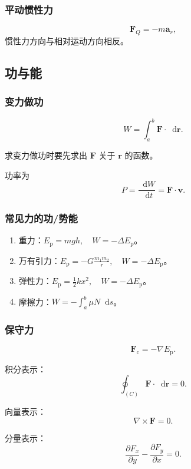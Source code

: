 \documentclass[UTF8,fontset=fandol,zihao=5]{ctexart}
\newcommand{\vect}[1]{\bm{#1}}
\newcommand{\dif}{\mathop{}\!\mathrm{d}}
\begin{document}
\subsubsection{平动惯性力}

\[
  \vect F_Q=-m\vect a_r,
\]
惯性力方向与相对运动方向相反。

\subsection{功与能}

\subsubsection{变力做功}

\[
  W=\int_a^b\vect F\cdot\dif\vect r.
\]

\begin{method}[【方法】求变力做功]
求变力做功时要先求出 \(\vect F\) 关于 \(\vect r\) 的函数。

功率为
\[
  P=\frac{\dif W}{\dif t}=\vect F\cdot\vect v.
\]
\end{method}

\subsubsection{常见力的功/势能}

\begin{enumerate}
  \item 重力：\(E_{\mathrm p}=mgh,\quad W=-\Delta E_{\mathrm p}\)。
  \item 万有引力：\(\displaystyle E_{\mathrm p}=-G\frac{m_1m_2}{r},\quad W=-\Delta E_{\mathrm p}\)。
  \item 弹性力：\(\displaystyle E_{\mathrm p}=\frac12kx^2,\quad W=-\Delta E_{\mathrm p}\)。
  \item 摩擦力：\(\displaystyle W=-\int_a^b\mu N\dif s\)。
\end{enumerate}

\subsubsection{保守力}

\[
  \vect F_{\mathrm c}=-\nabla E_{\mathrm p}.
\]

\begin{method}[【方法】判断保守力]
积分表示：
\[
  \oint_{(C)}\vect F\cdot\dif\vect r=0.
\]

向量表示：
\[
  \nabla\times\vect F=0.
\]

分量表示：
\[
  \frac{\partial F_x}{\partial y}-\frac{\partial F_y}{\partial x}=0.
\]
\end{method}
\end{document}
